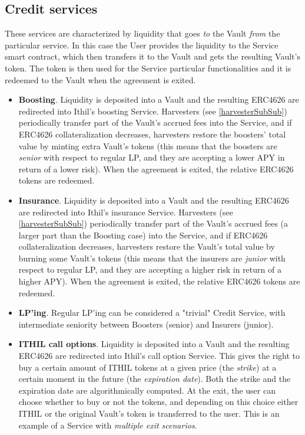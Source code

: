 \documentclass[a4paper,10 pt]{article}
\theoremstyle{definition}
\begin{document}
\subsection{Credit services}\label{csFirstSec}

These services are characterized by liquidity that goes {\it to} the Vault {\it from} the particular service. In this case the User provides the liquidity to the Service smart contract, which then transfers it to the Vault and gets the resulting Vault's token. The token is then used for the Service particular functionalities and it is redeemed to the Vault when the agreement is exited.

\begin{itemize}
\item {\bf Boosting}. Liquidity is deposited into a Vault and the resulting ERC4626 are redirected into Ithil's boosting Service. Harvesters (see \ref{harvesterSubSub}) periodically transfer part of the Vault's accrued fees into the Service, and if ERC4626 collateralization decreases, harvesters restore the boosters' total value by minting extra Vault's tokens (this means that the boosters are {\it senior} with respect to regular LP, and they are accepting a lower APY in return of a lower risk). When the agreement is exited, the relative ERC4626 tokens are redeemed.

\item {\bf Insurance}. Liquidity is deposited  into a Vault and the resulting ERC4626 are redirected into Ithil's insurance Service.  Harvesters (see \ref{harvesterSubSub}) periodically transfer part of the Vault's accrued fees (a larger part than the Boosting case) into the Service,  and if ERC4626 collateralization decreases, harvesters restore the Vault's total value by burning some Vault's tokens  (this means that the insurers are {\it junior} with respect to regular LP, and they are accepting a higher risk in return of a higher APY). When the agreement is exited, the relative ERC4626 tokens are redeemed.

\item {\bf LP'ing}. Regular LP'ing can be considered a "trivial" Credit Service, with intermediate seniority between Boosters (senior) and Insurers (junior).

\item {\bf ITHIL call options}. Liquidity is deposited  into a Vault and the resulting ERC4626 are redirected into Ithil's call option Service. This gives the right to buy a certain amount of ITHIL tokens at a given price (the {\it strike}) at a certain moment in the future (the {\it expiration date}). Both the strike and the expiration date are algorithmically computed. At the exit, the user can choose whether to buy or not the tokens, and depending on this choice either ITHIL or the original Vault's token is transferred to the user. This is an example of a Service with {\it multiple exit scenarios}.


\end{itemize}
\end{document}
